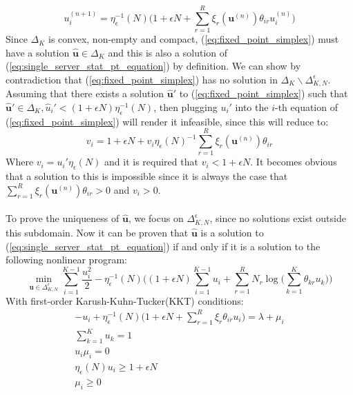 \begin{equation}\label{eq:fixed_point_simplex}
    u_i^{(n+1)} = \eta_{\epsilon}^{-1}(N) \bigg( 1 + \epsilon N + \sum_{r=1}^R \xi_r (\mathbf{u}^{(n)}) \theta_{ir} u_i^{(n)}  \bigg)
\end{equation}
Since \(\Delta_K\) is convex, non-empty and compact, (\ref{eq:fixed_point_simplex}) must have a solution \(\mathbf{\hat{u}} \in \Delta_K\) and this is also a solution of (\ref{eq:single_server_stat_pt_equation}) by definition. We can show by contradiction that (\ref{eq:fixed_point_simplex}) has no solution in \(\Delta_K \backslash \Delta_{K,N}^{\epsilon}\). Assuming that there exists a solution \(\mathbf{\hat{u}}'\) to (\ref{eq:fixed_point_simplex}) such that \(\mathbf{\hat{u}}' \in \Delta_K, \hat{u}_i' < (1+\epsilon N )\eta_{\epsilon}^{-1}(N)\), then plugging \(u_i'\) into the \(i\)-th equation of (\ref{eq:fixed_point_simplex}) will render it infeasible, since this will reduce to:
\[v_i = 1 + \epsilon N + v_i \eta_{\epsilon}(N)^{-1} \sum_{r=1}^R \xi_r (\mathbf{u}^{(n)}) \theta_{ir}\]
Where \(v_i = u_i' \eta_\epsilon (N)\) and it is required that \(v_i < 1 + \epsilon N\). It becomes obvious that a solution to this is impossible since it is always the case that \(\sum_{r=1}^R \xi_r (\mathbf{u}^{(n)}) \theta_{ir} > 0\) and \(v_i > 0\).
\\\\
To prove the uniqueness of \(\mathbf{\hat{u}}\), we focus on \(\Delta_{K,N}^{\epsilon}\), since no solutions exist outside this subdomain. Now it can be proven that \(\mathbf{\hat{u}}\) is a solution to (\ref{eq:single_server_stat_pt_equation}) if and only if it is a solution to the following nonlinear program:
\begin{equation}
    \min_{\mathbf{u} \in \Delta_{K,N}^\epsilon} \sum_{i=1}^{K-1} \frac{u_i^2}{2} - \eta_{\epsilon}^{-1}(N)
        \bigg( (1 + \epsilon N) \sum_{i=1}^{K-1} u_i + \sum_{r=1}^R N_r \log \bigg(  \sum_{k=1}^K \theta_{kr} u_k \bigg)  \bigg)
\end{equation}
With first-order Karush-Kuhn-Tucker(KKT) conditions:
\begin{gather*}
    -u_i + \eta_{\epsilon}^{-1}(N) \bigg( 1 + \epsilon N + \sum_{r=1}^R \xi_r \theta_{ir} u_i \bigg) = \lambda + \mu_i \\
    \sum_{k=1}^K u_k = 1 \\
    u_i \mu_i = 0\\
    \eta_{\epsilon}(N) u_i \geq 1 + \epsilon N\\
    \mu_i \geq 0\\
\end{gather*}
